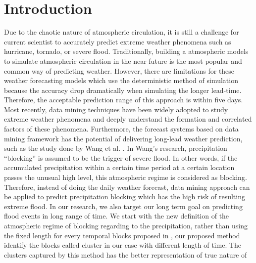 \documentclass{acm_proc_article-sp}
\begin{document}


\section{Introduction}
\label{sec:intro}
Due to the chaotic nature of atmospheric circulation, it is still a challenge
for current scientist to accurately predict extreme weather phenomena such as
hurricane, tornado, or severe flood. Traditionally, building a atmospheric
models to simulate atmospheric circulation in the near future is the most
popular and common way of predicting weather.\cite{cloke2009ensemble} However,
there are limitations for these weather forecasting models which use the
deterministic method of simulation because the accuracy drop dramatically when
simulating the longer
lead-time.\cite{:/content/aip/magazine/physicstoday/article/65/3/10.1063/PT.3.1475}
Therefore, the acceptable prediction range of this approach is within five days.
\newline Most recently, data mining techniques have been widely adopted to
study extreme weather phenomena and deeply understand the formation and
correlated factors of these
phenomena.
\cite{li2008real} \cite{supinie2009spatiotemporal} \cite{mcgovern2011using}
 \cite{Wang:2013:TLF:2487575.2488220} Furthermore, the forecast systems based on
data mining framework has the potential of delivering long-lead weather
prediction, such as the study done by Wang et al.
\cite{Wang:2013:TLF:2487575.2488220}. In Wang's research, precipitation
``blocking'' is assumed to be the trigger of severe flood. In other words, if
the accumulated precipitation within a certain time period at a certain location
passes the unusual high level, this atmospheric regime is considered as
blocking. Therefore, instead of doing the daily weather forecast, data mining
approach can be applied to predict precipitation blocking which has the high
risk of resulting extreme flood.
\newline In our research, we also target our long term goal on predicting flood
events in long range of time. We start with the new definition of the atmospheric
regime of blocking regarding to the precipitation, rather than using the fixed
length for every temporal blocks proposed
in \cite{Wang:2013:TLF:2487575.2488220}, our proposed method identify the
blocks called cluster in our case with different length of time. The
clusters captured by this method has the better representation of true nature of
\end{document}
